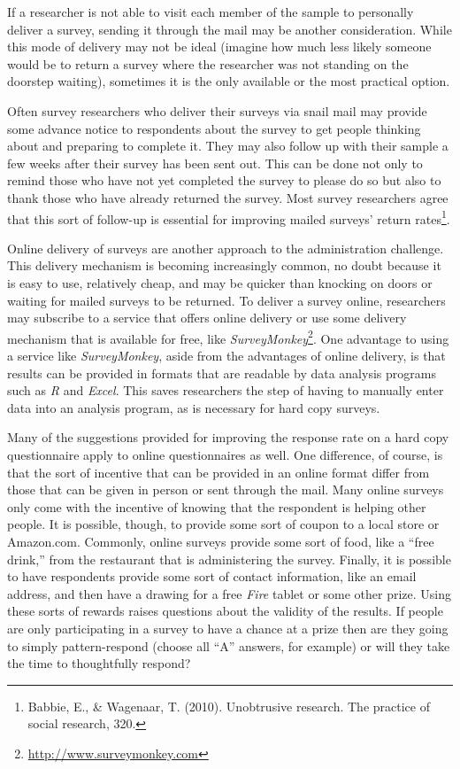 If a researcher is not able to visit each member of the sample to personally deliver a survey, sending it through the mail may be another consideration. While this mode of delivery may not be ideal (imagine how much less likely someone would be to return a survey where the researcher was not standing on the doorstep waiting), sometimes it is the only available or the most practical option.

Often survey researchers who deliver their surveys via snail mail may provide some advance notice to respondents about the survey to get people thinking about and preparing to complete it. They may also follow up with their sample a few weeks after their survey has been sent out. This can be done not only to remind those who have not yet completed the survey to please do so but also to thank those who have already returned the survey. Most survey researchers agree that this sort of follow-up is essential for improving mailed surveys’ return rates\footnote{Babbie, E., \& Wagenaar, T. (2010). Unobtrusive research. The practice of social research, 320.}.

Online delivery of surveys are another approach to the administration challenge. This delivery mechanism is becoming increasingly common, no doubt because it is easy to use, relatively cheap, and may be quicker than knocking on doors or waiting for mailed surveys to be returned. To deliver a survey online, researchers may subscribe to a service that offers online delivery or use some delivery mechanism that is available for free, like \textit{SurveyMonkey}\footnote{\url{http://www.surveymonkey.com}}. One advantage to using a service like \textit{SurveyMonkey}, aside from the advantages of online delivery, is that results can be provided in formats that are readable by data analysis programs such as \textit{R} and \textit{Excel}. This saves researchers the step of having to manually enter data into an analysis program, as is necessary for hard copy surveys.

Many of the suggestions provided for improving the response rate on a hard copy questionnaire apply to online questionnaires as well. One difference, of course, is that the sort of incentive that can be provided in an online format differ from those that can be given in person or sent through the mail. Many online surveys only come with the incentive of knowing that the respondent is helping other people. It is possible, though, to provide some sort of coupon to a local store or Amazon.com. Commonly, online surveys provide some sort of food, like a ``free drink,'' from the restaurant that is administering the survey. Finally, it is possible to have respondents provide some sort of contact information, like an email address, and then have a drawing for a free \textit{Fire} tablet or some other prize. Using these sorts of rewards raises questions about the validity of the results. If people are only participating in a survey to have a chance at a prize then are they going to simply pattern-respond (choose all ``A'' answers, for example) or will they take the time to thoughtfully respond?

